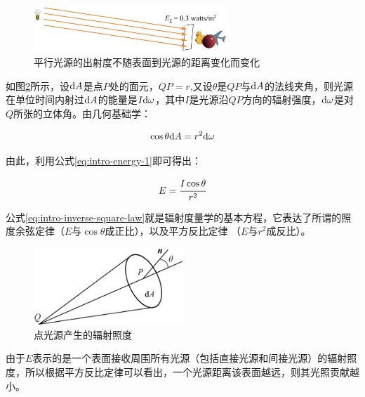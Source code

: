 \begin{figure}
\sidecaption
	\includegraphics[width=0.65\textwidth]{figures/intro/directional-irradiance}
	\caption{平行光源的出射度不随表面到光源的距离变化而变化}
	\label{f:intro-directional-irradiance}
\end{figure}

如图\ref{f:intro-inverse-square-law}所示，设${\rm d}A$是点$P$处的面元，$QP=r$,又设$\theta$是$QP$与${\rm d}A$的法线夹角，则光源在单位时间内射过${\rm d}A$的能量是$I{\rm d}\omega$，其中$I$是光源沿$QP$方向的辐射强度，${\rm d}\omega$是对$Q$所张的立体角。由几何基础学：

\begin{equation}
	\cos\theta {\rm d}A=r^{2}{\rm d}\omega
\end{equation}


\noindent 由此，利用公式\ref{eq:intro-energy-1}即可得出：

\begin{equation}\label{eq:intro-inverse-square-law}
	E= \cfrac{I\cos\theta}{r^{2}}
\end{equation}

公式\ref{eq:intro-inverse-square-law}就是辐射度量学的基本方程，它表达了所谓的照度余弦定律（$E$与$\cos\theta$成正比），以及平方反比定律 （$E$与$r^{2}$成反比）。

\begin{figure}
\sidecaption
	\includegraphics[width=0.5\textwidth]{figures/intro/inverse-square-law}
	\caption{点光源产生的辐射照度}
	\label{f:intro-inverse-square-law}
\end{figure}

由于$E$表示的是一个表面接收周围所有光源（包括直接光源和间接光源）的辐射照度，所以根据平方反比定律可以看出，一个光源距离该表面越远，则其光照贡献越小。









